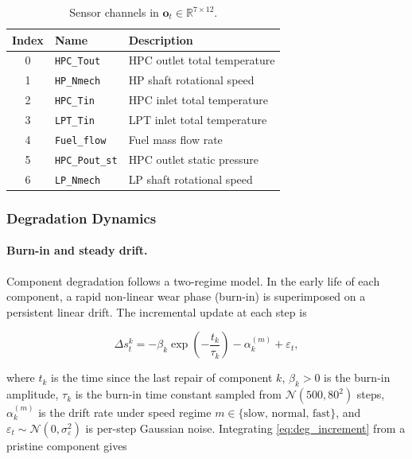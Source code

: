\begin{table}[h]
\centering
\caption{Sensor channels in $\mathbf{o}_t \in \mathbb{R}^{7 \times 12}$.}
\label{tab:sensor_names}
\small
\begin{tabular}{cll}
\toprule
Index & Name & Description \\
\midrule
0 & \texttt{HPC\_Tout}    & HPC outlet total temperature \\
1 & \texttt{HP\_Nmech}    & HP shaft rotational speed \\
2 & \texttt{HPC\_Tin}     & HPC inlet total temperature \\
3 & \texttt{LPT\_Tin}     & LPT inlet total temperature \\
4 & \texttt{Fuel\_flow}   & Fuel mass flow rate \\
5 & \texttt{HPC\_Pout\_st}& HPC outlet static pressure \\
6 & \texttt{LP\_Nmech}    & LP shaft rotational speed \\
\bottomrule
\end{tabular}
\end{table}

\subsubsection{Degradation Dynamics}
\label{sec:dataset_degradation}

\paragraph{Burn-in and steady drift.}
Component degradation follows a two-regime model. In the early life of
each component, a rapid non-linear wear phase (burn-in) is superimposed
on a persistent linear drift. The incremental update at each step is

\begin{equation}
  \Delta s_t^k = -\beta_k \exp\!\left(-\frac{t_k}{\tau_k}\right)
                 - \alpha_k^{(m)} + \varepsilon_t,
  \label{eq:deg_increment}
\end{equation}

where $t_k$ is the time since the last repair of component $k$,
$\beta_k > 0$ is the burn-in amplitude, $\tau_k$ is the burn-in time
constant sampled from $\mathcal{N}(500, 80^2)$ steps, $\alpha_k^{(m)}$
is the drift rate under speed regime $m \in \{\text{slow, normal, fast}\}$,
and $\varepsilon_t \sim \mathcal{N}(0, \sigma_\varepsilon^2)$ is
per-step Gaussian noise. Integrating \eqref{eq:deg_increment} from a
pristine component gives

